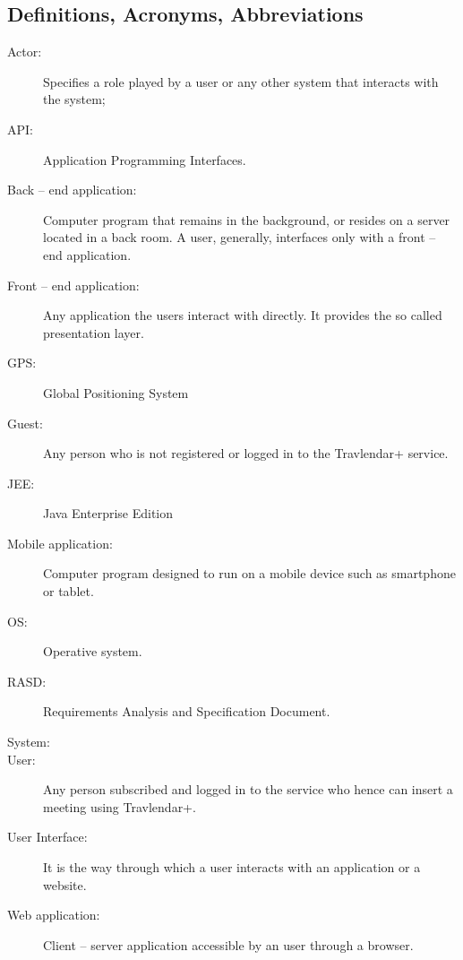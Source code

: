 \documentclass{article}
\begin{document}
	
	\subsection{Definitions, Acronyms, Abbreviations}
	\begin{description}
		\item[Actor:] Specifies a role played by a user or any other system that interacts with the system;
		\item[API: ]Application Programming Interfaces.
		\item[Back -- end application:] Computer program that remains in the background, or resides on a server located in a back room. A user, generally, interfaces only with a front -- end application.
		\item[Front -- end application:] Any application the users interact with directly. It provides the so called presentation layer.
		\item[GPS:] Global Positioning System
		\item[Guest:] Any person who is not registered or logged in to the Travlendar+ service.
		\item[JEE:] Java Enterprise Edition
		\item[Mobile application:] Computer program designed to run on a mobile device such as smartphone or tablet.
		\item[OS:] Operative system.
		\item[RASD:] Requirements Analysis and Specification Document.
		\item[System:]
		\item[User:] Any person subscribed and logged in to the service who hence can insert a meeting using Travlendar+.
		\item[User Interface:] It is the way through which a user interacts with an application or a website.
		\item[Web application:] Client -- server application accessible by an user through a browser.
	\end{description}
	
	
\end{document}

